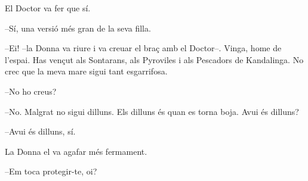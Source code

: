 El Doctor va fer que sí.

--Sí, una versió més gran de la seva filla.

--Ei! --la Donna va riure i va creuar el braç amb el Doctor--. Vinga,
home de l'espai. Has vençut als Sontarans, als Pyroviles i als Pescadors
de Kandalinga. No crec que la meva mare sigui tant esgarrifosa.

--No ho creus?

--No. Malgrat no sigui dilluns. Els dilluns és quan es torna boja. Avui
és dilluns?

--Avui és dilluns, sí.

La Donna el va agafar més fermament.

--Em toca protegir-te, oi?
